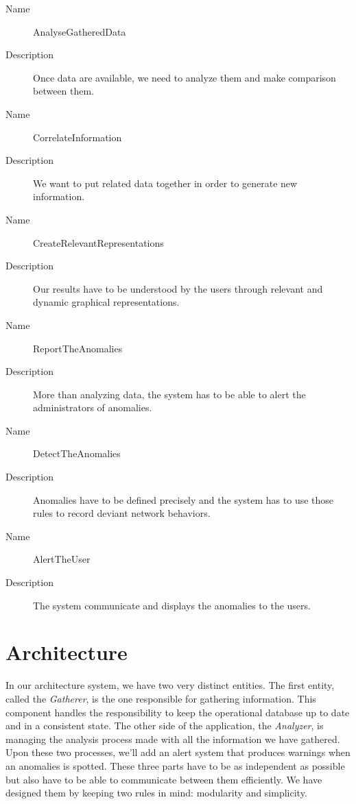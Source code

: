 \begin{description}
  \item[Name] AnalyseGatheredData
  \item[Description] Once data are available, we need to analyze them and make comparison between them.
\end{description}

\begin{description}
  \item[Name] CorrelateInformation
  \item[Description] We want to put related data together in order to generate new information.
\end{description}

\begin{description}
  \item[Name] CreateRelevantRepresentations
  \item[Description] Our results have to be understood by the users through relevant and dynamic graphical representations.
\end{description}

\begin{description}
  \item[Name] ReportTheAnomalies
  \item[Description] More than analyzing data, the system has to be able to alert the administrators of anomalies.
\end{description}

\begin{description}
  \item[Name] DetectTheAnomalies
  \item[Description] Anomalies have to be defined precisely and the system has to use those rules to record deviant network behaviors.
\end{description}

\begin{description}
  \item[Name] AlertTheUser
  \item[Description] The system communicate and displays the anomalies to the users.
\end{description}


\section{Architecture}
In our architecture system, we have two very distinct entities. The first entity, called the \textit{Gatherer}, is the one responsible for gathering information. This component handles the responsibility to keep the operational database up to date and in a consistent state. The other side of the application, the \textit{Analyzer}, is managing the analysis process made with all the information we have gathered. Upon these two processes, we'll add an alert system that produces warnings when an anomalies is spotted. These three parts have to be as independent as possible but also have to be able to communicate between them efficiently. We have designed them by keeping two rules in mind: modularity and simplicity.


